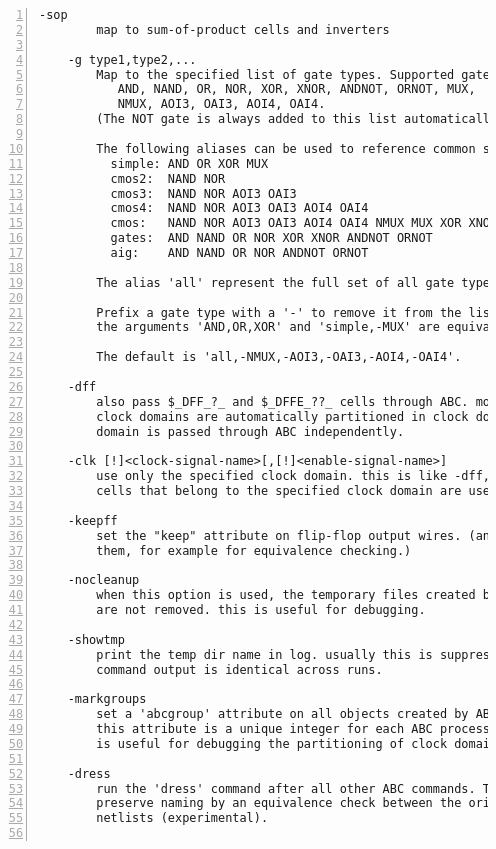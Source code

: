 \begin{lstlisting}[numbers=left,frame=single]
    -sop
        map to sum-of-product cells and inverters

    -g type1,type2,...
        Map to the specified list of gate types. Supported gates types are:
           AND, NAND, OR, NOR, XOR, XNOR, ANDNOT, ORNOT, MUX,
           NMUX, AOI3, OAI3, AOI4, OAI4.
        (The NOT gate is always added to this list automatically.)

        The following aliases can be used to reference common sets of gate types:
          simple: AND OR XOR MUX
          cmos2:  NAND NOR
          cmos3:  NAND NOR AOI3 OAI3
          cmos4:  NAND NOR AOI3 OAI3 AOI4 OAI4
          cmos:   NAND NOR AOI3 OAI3 AOI4 OAI4 NMUX MUX XOR XNOR
          gates:  AND NAND OR NOR XOR XNOR ANDNOT ORNOT
          aig:    AND NAND OR NOR ANDNOT ORNOT

        The alias 'all' represent the full set of all gate types.

        Prefix a gate type with a '-' to remove it from the list. For example
        the arguments 'AND,OR,XOR' and 'simple,-MUX' are equivalent.

        The default is 'all,-NMUX,-AOI3,-OAI3,-AOI4,-OAI4'.

    -dff
        also pass $_DFF_?_ and $_DFFE_??_ cells through ABC. modules with many
        clock domains are automatically partitioned in clock domains and each
        domain is passed through ABC independently.

    -clk [!]<clock-signal-name>[,[!]<enable-signal-name>]
        use only the specified clock domain. this is like -dff, but only FF
        cells that belong to the specified clock domain are used.

    -keepff
        set the "keep" attribute on flip-flop output wires. (and thus preserve
        them, for example for equivalence checking.)

    -nocleanup
        when this option is used, the temporary files created by this pass
        are not removed. this is useful for debugging.

    -showtmp
        print the temp dir name in log. usually this is suppressed so that the
        command output is identical across runs.

    -markgroups
        set a 'abcgroup' attribute on all objects created by ABC. The value of
        this attribute is a unique integer for each ABC process started. This
        is useful for debugging the partitioning of clock domains.

    -dress
        run the 'dress' command after all other ABC commands. This aims to
        preserve naming by an equivalence check between the original and post-ABC
        netlists (experimental).


\end{lstlisting}
